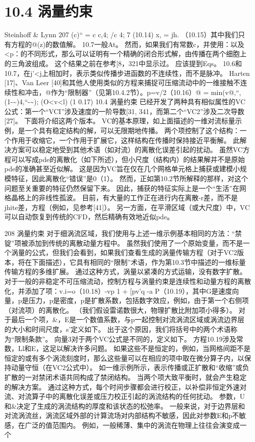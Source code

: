 \documentclass[UTF8,11pt,a4paper,openany,fontset=fandol]{ctexbook}
\begin{document}
\section{10.4 涡量约束}
Steinhoff \& Lynn 207 (c)“ = c c,4; /c 4; 7 (10.14) x, = jh. （10.15）其中我们只有方程的@(z)的数值解。 10.7一般At。 然而，如果我们有常数c，并使用：以及<p：的不同形式，那么可以证明有一个精确的闭合形式解，由传播在两个细胞上的三角波组成。 这个结果之前在参考[8，321中显示过。 应该提到Eqs。 10.6和10.7，在j'<j上相加时，表示类似传播步进函数的不连续性，而不是脉冲。 Harten [17]、Van Leer [40]和其他人使用类似的方程来捕捉可压缩流动中的一维接触不连续性和冲击，@作为“限制器”（见第10.4.2节）。p=v/2（10.16）@ = min(v@,“, (1-\textasciitilde{})4,“-\textasciitilde{}); (O<v<l) (1 0.17) 10.4 涡量约束 已经开发了两种具有相似属性的VC公式：第一个“VCI”涉及速度的一阶导数[31, 341，而第二个“VC2”涉及二次导数[27]。 下面将介绍这两个版本。 VC的基本原理，如上面描述的一维对流标量示例，是一个具有稳定结构的解，可以无限期地传播。 两个项控制了这个结构：一个作用于收缩它，一个作用于扩展它，这样结构在传播时保持接近平衡解。 此解决方案可以稳定地受到其他术语（如对流）的离散化误差引起的扰动。 虽然VC方程可以写成pde的离散化（如下所述），但小尺度（结构内）的结果解并不是原始pde的准确甚至近似解。 这是因为VC旨在仅在几个网格单元格上捕获或建模小规模特征，因此离散化“错误”是0（1）。 然而，正如第10.2节所解释的那样，对这个问题至关重要的特征仍然保留下来。 因此，捕获的特征实际上是一个“生活”在网格晶格上的非线性孤波。 目前，有大量的工作正在进行内在离散-r差，而不是jhite差，方程（例如，见参考[41]）。 另一方面，在平滑区域（或大尺度）中，VC可以自动恢复到传统的CFD，然后精确有效地近似pde。

208 涡量约束 对于细涡流区域，我们使用与上述一维示例基本相同的方法：“禁锭”项被添加到传统的离散动量方程中。 虽然我们使用了一个原始变量，而不是一个涡量的公式，但我们会看到，如果我们查看生成的涡量传输方程（对于VC2版本，将在下面描述），它具有相同的“限制”术语，作为第10.3节中描述的一维标量传输方程的多维扩展。 通过这种方式，涡量以紧凑的方式运输，没有数字扩散。 对于一般的非稳定不可压缩流动，控制方程与涡量约束是连续性和动量方程的离散化，并添加了项：v.i=o（10.18）-vp 1 + [pv'q -a P（10.19），其中G是速度向量，p是压力，p是密度，p是扩散系数，包括数字效应，例如，由于第一个右侧项（对流项）的离散化。 （我们假设雷诺数很大，物理扩散比附加项小得多）。 对于最后一个项，\&，E是一个数值系数，与p一起控制对流涡流区域或涡流边界层的大小和时间尺度，s'定义如下。 出于这个原因，我们将括号中的两个术语称为“限制条款”。 向量3对于两个VC公式是不同的，定义如下。 方程10.19涉及常数，Ll和E，这足以解决许多问题。 如果这些不是恒定的，例如，当网格间距不是恒定的或有多个涡流刻度时，那么这些量可以在相应的项中取在微分算子内，以保持动量守恒（在VC2公式中）。 如一维示例所示，表示传播或正扩散和“收缩”或负扩散的一对禁闭术语共同构成了禁闭结构。 当两个项大致平衡时，就会产生稳定的解决方案。 通过这种方式，每个时间步骤都会进行校正，以补偿非恒定外速对流、对流算子中的离散化误差或压力校正引起的涡流结构的任何扰动。 参数，U和\&决定了生成的涡流结构的厚度和该状态的松弛率。 一般来说，对于边界层和对流涡流丝，涡流区域外部的计算流场对内部结构不敏感，因此对参数E和p不敏感，在广泛的值范围内。 例如，一般稀薄、集中的涡流在物理上往往会演变成一个
\end{document}
